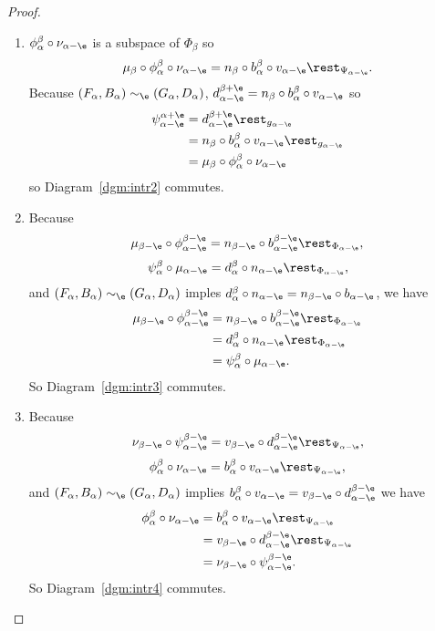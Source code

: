 \begin{proof}
\begin{enumerate}[label=\Roman*.]
    \item $\phi_\alpha^\beta\circ \nu_{\alpha-\e}$ is a subspace of $\Phi_\beta$ so
      \[ \mu_\beta\circ \phi_\alpha^\beta\circ \nu_{\alpha-\e} = n_\beta\circ b_\alpha^\beta\circ v_{\alpha-\e}\rest_{\Psi_{\alpha-\e}}. \]
      Because $(F_\alpha, B_\alpha)\sim_\e (G_\alpha, D_\alpha)$, $d_{\alpha-\e}^{\beta+\e} = n_\beta\circ b_\alpha^\beta\circ v_{\alpha-\e}$ so
      \begin{align*}
        \psi_{\alpha-\e}^{\alpha+\e} &= d_{\alpha-\e}^{\beta+\e}\rest_{g_{\alpha-\e}}\\
          &=n_\beta\circ b_\alpha^\beta\circ v_{\alpha-\e}\rest_{g_{\alpha-\e}}\\
          &= \mu_\beta\circ \phi_\alpha^\beta\circ \nu_{\alpha-\e}
      \end{align*}
      so Diagram~\ref{dgm:intr2} commutes.
    \item Because
      \[ \mu_{\beta - \e}\circ \phi_{\alpha-\e}^{\beta-\e} = n_{\beta-\e}\circ b_{\alpha-\e}^{\beta-\e}\rest_{\Phi_{\alpha-\e}}, \]
      \[ \psi_\alpha^\beta\circ\mu_{\alpha-\e} = d_\alpha^\beta\circ n_{\alpha-\e}\rest_{\Phi_{\alpha-\e}},\]
      and $(F_\alpha, B_\alpha)\sim_\e (G_\alpha, D_\alpha)$ imples $d_\alpha^\beta\circ n_{\alpha-\e} = n_{\beta-\e}\circ b_{\alpha-\e}$, we have
      \begin{align*}
        \mu_{\beta - \e}\circ \phi_{\alpha-\e}^{\beta-\e} &= n_{\beta-\e}\circ b_{\alpha-\e}^{\beta-\e}\rest_{\Phi_{\alpha-\e}}\\
          &= d_\alpha^\beta\circ n_{\alpha-\e}\rest_{\Phi_{\alpha-\e}}\\
          &= \psi_\alpha^\beta\circ\mu_{\alpha-\e}.
      \end{align*}
      So Diagram~\ref{dgm:intr3} commutes.
    \item Because
      \[\nu_{\beta-\e}\circ \psi_{\alpha-\e}^{\beta-\e} = v_{\beta-\e}\circ d_{\alpha-\e}^{\beta-\e}\rest_{\Psi_{\alpha-\e}},\]
      \[\phi_\alpha^\beta\circ \nu_{\alpha-\e} = b_\alpha^\beta\circ v_{\alpha-\e}\rest_{\Psi_{\alpha-\e}},\]
      and $(F_\alpha, B_\alpha)\sim_\e (G_\alpha, D_\alpha)$ implies $b_\alpha^\beta\circ v_{\alpha-\e} = v_{\beta-\e}\circ d_{\alpha-\e}^{\beta-\e}$ we have
      \begin{align*}
        \phi_\alpha^\beta\circ \nu_{\alpha-\e} &= b_\alpha^\beta\circ v_{\alpha-\e}\rest_{\Psi_{\alpha-\e}}\\
          &= v_{\beta-\e}\circ d_{\alpha-\e}^{\beta-\e}\rest_{\Psi_{\alpha-\e}}\\
          &= \nu_{\beta-\e}\circ \psi_{\alpha-\e}^{\beta-\e}.
      \end{align*}
      So Diagram~\ref{dgm:intr4} commutes.
    \end{enumerate}
\end{proof}
